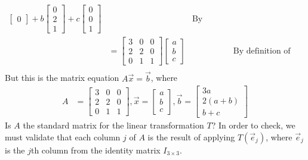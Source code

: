 \documentclass[10pt,letterpaper,final]{report}
\newcommand{\reason}[1]{&& \text{#1}}
\begin{document}
\begin{enumerate}[label=(\alph*)]
\begin{align*}
\begin{bmatrix}
                                   0
                                 \end{bmatrix} + b\begin{bmatrix}
                                                    0 \\
                                                    2 \\
                                                    1
                                                  \end{bmatrix} + c\begin{bmatrix}
                                                                     0 \\
                                                                     0 \\
                                                                     1
                                                                   \end{bmatrix} \reason{By factoring}                                  \\[1ex]
                            & = \begin{bmatrix}
                                  3 & 0 & 0 \\
                                  2 & 2 & 0 \\
                                  0 & 1 & 1
                                \end{bmatrix}\begin{bmatrix}a\\b\\c\end{bmatrix} \reason{By definition of matrix vector multiplication} \\[1ex]
        \end{align*}
        But this is the matrix equation $A\vec{x} = \vec{b}$, where
        \begin{align*}
          A & = \begin{bmatrix}
                  3 & 0 & 0 \\
                  2 & 2 & 0 \\
                  0 & 1 & 1
                \end{bmatrix}, \vec{x} = \begin{bmatrix}a\\b\\c\end{bmatrix}, \vec{b} = \begin{bmatrix}3a \\2(a+b) \\b+c\end{bmatrix}
        \end{align*}
        Is $A$ the standard matrix for the linear transformation $T$? In order to check, we must validate that each column $j$ of $A$ is the result of applying $T(\vec{e}_j)$, where $\vec{e}_j$ is the $j$th column from the identity matrix $I_{3 \times 3}$.


\end{enumerate}
\end{document}
